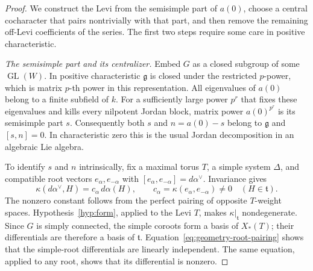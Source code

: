 \begin{proof}
We construct the Levi from the semisimple part of $a(0)$, choose a
central cocharacter that pairs nontrivially with that part, and then
remove the remaining off-Levi coefficients of the series.  The first
two steps require some care in positive characteristic.

\emph{The semisimple part and its centralizer.}
Embed $G$ as a
closed subgroup of some $\operatorname{GL}(W)$.  In positive
characteristic $\mathfrak g$ is closed under the restricted $p$-power,
which is matrix $p$-th power in this representation.  All eigenvalues
of $a(0)$ belong to a finite subfield of $k$.  For a sufficiently large
power $p^r$ that fixes these eigenvalues and kills every nilpotent
Jordan block, matrix power $a(0)^{p^r}$ is its semisimple part $s$.
Consequently both $s$ and $n=a(0)-s$ belong to $\mathfrak g$ and
$[s,n]=0$.  In characteristic zero this is the usual Jordan
decomposition in an algebraic Lie algebra.

To identify $s$ and $n$ intrinsically, fix a maximal torus $T$, a simple system
$\Delta$, and compatible root vectors $e_\alpha,e_{-\alpha}$ with
$[e_\alpha,e_{-\alpha}]=d\alpha^\vee$.  Invariance gives
\begin{equation}\label{eq:geometry-root-pairing}
 \kappa(d\alpha^\vee,H)=c_\alpha\,d\alpha(H),
 \qquad c_\alpha=\kappa(e_\alpha,e_{-\alpha})\ne0
 \quad(H\in\mathfrak t).
\end{equation}
The nonzero constant follows from the perfect pairing of opposite
$T$-weight spaces.  Hypothesis~\ref{hyp:form}, applied to the Levi $T$, makes
$\kappa|_{\mathfrak t}$ nondegenerate.  Since $G$ is simply connected,
the simple coroots form a basis of $X_*(T)$; their differentials are
therefore a basis of $\mathfrak t$.  Equation~\eqref{eq:geometry-root-pairing}
shows that the simple-root differentials are linearly independent.
The same equation, applied to any root, shows that its differential
is nonzero.


\end{proof}
